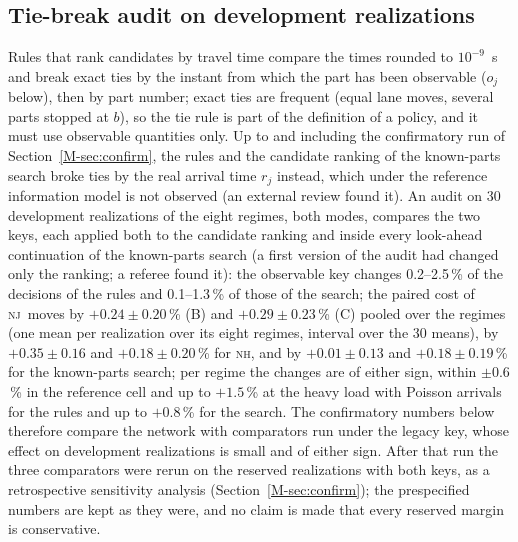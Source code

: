 \documentclass[11pt,a4paper]{article}
\theoremstyle{plain}
\theoremstyle{definition}
\theoremstyle{remark}
\newcommand{\nj}{\textsc{nj}}
\newcommand{\nh}{\textsc{nh}}
\begin{document}
\subsection{Tie-break audit on development realizations}
Rules that rank candidates by travel time compare the times rounded to
$10^{-9}$~s and break exact ties by the instant from which the part has been observable
($o_j$ below), then by part number; exact ties are frequent (equal lane moves, several
parts stopped at $b$), so the tie rule is part of the definition of a policy, and it
must use observable quantities only. Up to and including the confirmatory run of
Section~\ref{M-sec:confirm}, the rules and the candidate ranking of the known-parts search
broke ties by the real arrival time $r_j$ instead, which under the reference
information model is not observed (an external review found it). An audit on 30
development realizations of the eight regimes, both modes, compares the two keys, each
applied both to the candidate ranking and inside every look-ahead continuation of the
known-parts search (a first version of the audit had changed only the ranking; a
referee found it): the observable key changes 0.2--2.5\,\% of the decisions of the
rules and 0.1--1.3\,\% of those of the search; the paired cost of \nj\ moves by
$+0.24\pm0.20$\,\% (B) and $+0.29\pm0.23$\,\% (C) pooled over the regimes (one mean per
realization over its eight regimes, interval over the 30 means), by $+0.35\pm0.16$ and
$+0.18\pm0.20$\,\% for \nh, and by $+0.01\pm0.13$ and $+0.18\pm0.19$\,\% for the
known-parts search; per regime the changes are of either sign, within $\pm0.6$\,\%
in the reference cell and up to $+1.5$\,\% at the heavy load with Poisson arrivals
for the rules and up to $+0.8$\,\% for the search. The confirmatory numbers below therefore
compare the network with comparators run under the legacy key, whose effect on
development realizations is small and of either sign. After that run the three
comparators were rerun on the reserved realizations with both keys, as a retrospective
sensitivity analysis (Section~\ref{M-sec:confirm}); the prespecified numbers are kept as
they were, and no claim is made that every reserved margin is conservative.
\end{document}
